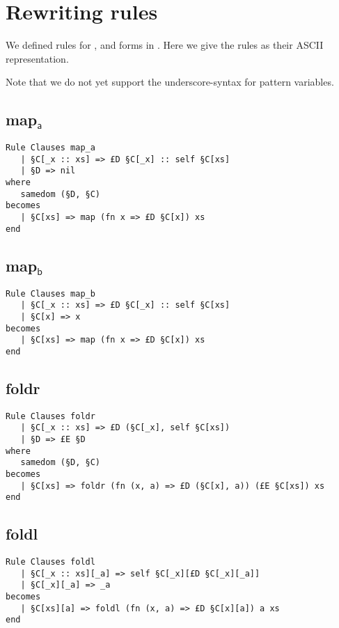 \chapter{Rewriting rules}
We defined rules for ,  and  forms in
. Here we give the rules as their ASCII
representation.

Note that we do not yet support the underscore-syntax for pattern variables.

\section{\textsf{map$_\textsf{a}$}}
\begin{verbatim}
Rule Clauses map_a
   | §C[_x :: xs] => £D §C[_x] :: self §C[xs]
   | §D => nil
where
   samedom (§D, §C)
becomes
   | §C[xs] => map (fn x => £D §C[x]) xs
end
\end{verbatim}

\section{\textsf{map$_\textsf{b}$}}
\begin{verbatim}
Rule Clauses map_b
   | §C[_x :: xs] => £D §C[_x] :: self §C[xs]
   | §C[x] => x
becomes
   | §C[xs] => map (fn x => £D §C[x]) xs
end
\end{verbatim}

\section{\textsf{foldr}}
\begin{verbatim}
Rule Clauses foldr
   | §C[_x :: xs] => £D (§C[_x], self §C[xs])
   | §D => £E §D
where
   samedom (§D, §C)
becomes
   | §C[xs] => foldr (fn (x, a) => £D (§C[x], a)) (£E §C[xs]) xs
end
\end{verbatim}

\newpage
\section{\textsf{foldl}}
\begin{verbatim}
Rule Clauses foldl
   | §C[_x :: xs][_a] => self §C[_x][£D §C[_x][_a]]
   | §C[_x][_a] => _a
becomes
   | §C[xs][a] => foldl (fn (x, a) => £D §C[x][a]) a xs
end
\end{verbatim}
